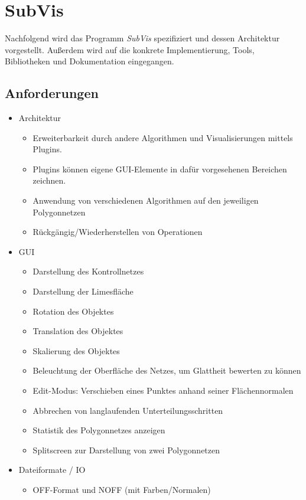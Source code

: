 \chapter{SubVis}

Nachfolgend wird das Programm \emph{SubVis} spezifiziert und dessen Architektur vorgestellt.
Außerdem wird auf die konkrete Implementierung, Tools, Bibliotheken und Dokumentation eingegangen.

\section{Anforderungen}

\begin{itemize}
 \item Architektur
 \begin{itemize}
 	\item Erweiterbarkeit durch andere Algorithmen und Visualisierungen mittels Plugins.
 	\item Plugins können eigene GUI-Elemente in dafür vorgesehenen Bereichen zeichnen.
 	  \item Anwendung von verschiedenen Algorithmen auf den jeweiligen Polygonnetzen
 	  \item Rückgängig/Wiederherstellen von Operationen
 \end{itemize}
 \item GUI
  \begin{itemize}
 	\item Darstellung des Kontrollnetzes
 	\item Darstellung der Limesfläche
 	\item Rotation des Objektes
 	\item Translation des Objektes
 	\item Skalierung des Objektes
 	\item Beleuchtung der Oberfläche des Netzes, um Glattheit bewerten zu können
 	\item Edit-Modus: Verschieben eines Punktes anhand seiner Flächennormalen
 	\item Abbrechen von langlaufenden Unterteilungsschritten
    \item Statistik des Polygonnetzes anzeigen
    \item Splitscreen zur Darstellung von zwei Polygonnetzen
 \end{itemize}
 \item Dateiformate / IO
 \begin{itemize}
 	\item OFF-Format und NOFF (mit Farben/Normalen)

\end{itemize}
\end{itemize}
